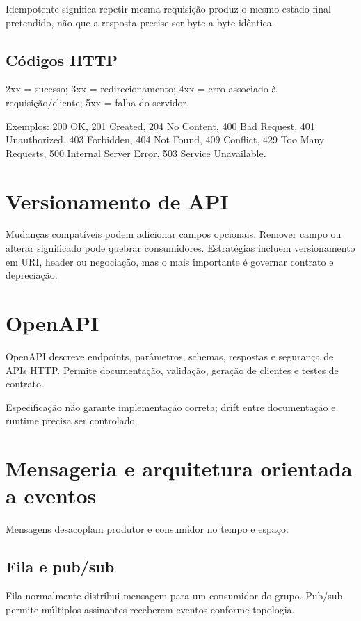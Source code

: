 Idempotente significa repetir mesma requisição produz o mesmo estado final pretendido, não que a resposta precise ser byte a byte idêntica.

\subsection{Códigos HTTP}

2xx = sucesso; 3xx = redirecionamento; 4xx = erro associado à requisição/cliente; 5xx = falha do servidor.

Exemplos: 200 OK, 201 Created, 204 No Content, 400 Bad Request, 401 Unauthorized, 403 Forbidden, 404 Not Found, 409 Conflict, 429 Too Many Requests, 500 Internal Server Error, 503 Service Unavailable.

\section{Versionamento de API}

Mudanças compatíveis podem adicionar campos opcionais. Remover campo ou alterar significado pode quebrar consumidores. Estratégias incluem versionamento em URI, header ou negociação, mas o mais importante é governar contrato e depreciação.

\section{OpenAPI}

OpenAPI descreve endpoints, parâmetros, schemas, respostas e segurança de APIs HTTP. Permite documentação, validação, geração de clientes e testes de contrato.

Especificação não garante implementação correta; drift entre documentação e runtime precisa ser controlado.

\section{Mensageria e arquitetura orientada a eventos}

Mensagens desacoplam produtor e consumidor no tempo e espaço.

\subsection{Fila e pub/sub}

Fila normalmente distribui mensagem para um consumidor do grupo. Pub/sub permite múltiplos assinantes receberem eventos conforme topologia.

